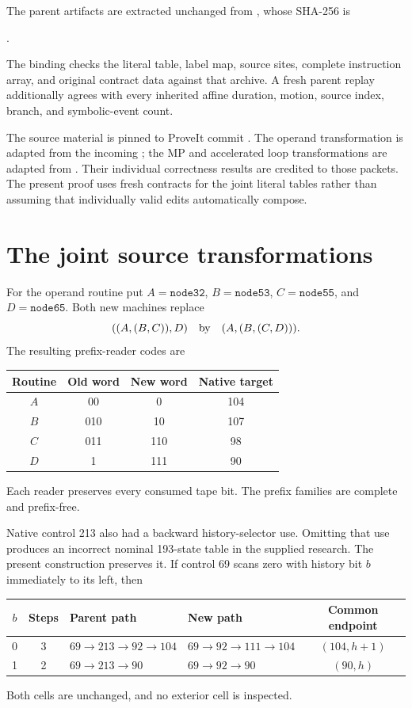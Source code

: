 \documentclass[11pt]{article}
\begin{document}
The parent artifacts are extracted unchanged from
, whose SHA-256 is
\begin{center}\small
{}.
\end{center}
The binding checks the literal table, label map, source sites, complete
instruction array, and original contract data against that archive.
A fresh parent replay additionally agrees with every inherited affine
duration, motion, source index, branch, and symbolic-event count.

The source material is pinned to ProveIt commit
.
The operand transformation is adapted from the incoming
; the MP and accelerated
loop transformations are adapted from
. Their individual
correctness results are credited to those packets. The present proof uses
fresh contracts for the joint literal tables rather than assuming that
individually valid edits automatically compose.

\section{The joint source transformations}

For the operand routine put
$A=\texttt{node32}$, $B=\texttt{node53}$,
$C=\texttt{node55}$, and $D=\texttt{node65}$.
Both new machines replace
\[
 ((A,(B,C)),D)\quad\hbox{by}\quad(A,(B,(C,D))).
\]
The resulting prefix-reader codes are
\begin{center}
\begin{tabular}{c@{\qquad}cc@{\qquad}c}
\toprule
Routine & Old word & New word & Native target\\
\midrule
$A$ & 00 & 0 & 104\\
$B$ & 010 & 10 & 107\\
$C$ & 011 & 110 & 98\\
$D$ & 1 & 111 & 90\\
\bottomrule
\end{tabular}
\end{center}
Each reader preserves every consumed tape bit. The prefix families are
complete and prefix-free.

Native control 213 also had a backward history-selector use. Omitting
that use produces an incorrect nominal 193-state table in the supplied
research. The present construction preserves it. If control 69 scans zero
with history bit $b$ immediately to its left, then
\begin{center}\small
\begin{tabular}{ccllc}
\toprule
$b$ & Steps & Parent path & New path & Common endpoint\\
\midrule
0 & 3 & $69\to213\to92\to104$ & $69\to92\to111\to104$ & $(104,h+1)$\\
1 & 2 & $69\to213\to90$ & $69\to92\to90$ & $(90,h)$\\
\bottomrule
\end{tabular}
\end{center}
Both cells are unchanged, and no exterior cell is inspected.
\end{document}

